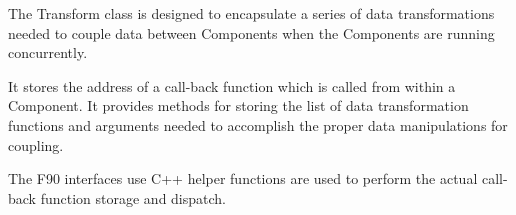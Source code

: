 %


The Transform class is designed to encapsulate a
series of data transformations needed to couple
data between Components when the Components are 
running concurrently.

It stores the address of a call-back function
which is called from within a Component.  It provides
methods for storing the list of data transformation
functions and arguments needed to accomplish the
proper data manipulations for coupling.

The F90 interfaces use
C++ helper functions are used to perform the actual
call-back function storage and dispatch.

